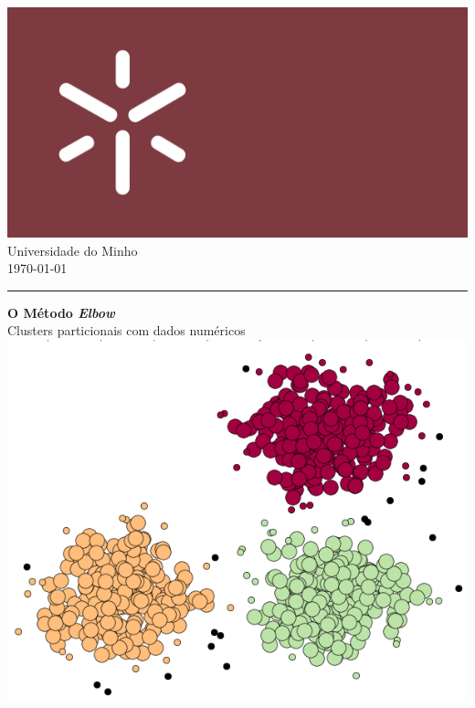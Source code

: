 \documentclass[12pt, a4paper, oneside]{scrreport}
\begin{document}
\renewcommand{\normalfont}{\selectfont} %
\normalfont

\clearpairofpagestyles




\begin{flushleft}
\includegraphics[scale = 0.075]{Minho_University.png}
 \large{\\Universidade do Minho\\\normalsize{\today}}
\end{flushleft}
\rule{\textwidth}{0.5pt}
\begin{flushright}
\Huge{\textbf{O Método \textit{Elbow}}} \\ {\Large Clusters particionais com dados numéricos}
\includegraphics[scale = 0.55]{Cluster-Segmentation.png}
\end{flushright}
\end{document}
